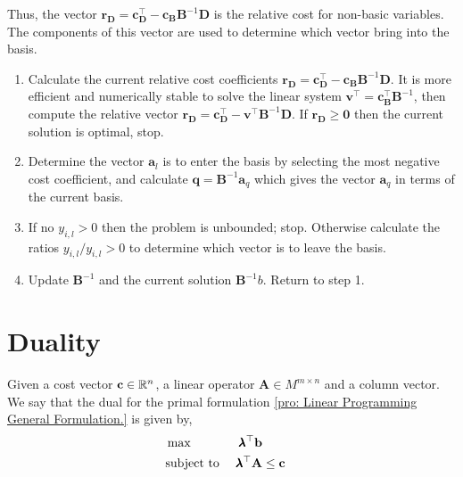 Thus, the vector $\mathbf{r}_{\mathbf{D}}=\mathbf{c}_{\mathbf{D}}^\top-\mathbf{c}_{\mathbf{B}}\mathbf{B}^{-1}\mathbf{D}$ is the relative cost for non-basic variables. The components of this vector are used to determine which vector bring into the basis.

\begin{enumerate}
	\item Calculate the current relative cost coefficients $\mathbf{r}_{\mathbf{D}}=\mathbf{c}_{\mathbf{D}}^\top-\mathbf{c}_{\mathbf{B}}\mathbf{B}^{-1}\mathbf{D}$. It is more efficient and numerically stable to solve the linear system $\mathbf{v}^\top = \mathbf{c}_{\mathbf{B}}^\top\mathbf{B}^{-1}$, then compute the relative vector
	$ \mathbf{r}_{\mathbf{D}}=\mathbf{c}_{\mathbf{D}}^\top-\mathbf{v}^\top\mathbf{B}^{-1}\mathbf{D}$. If $\mathbf{r}_{\mathbf{D}}\geq \mathbf{0}$ then the current solution is optimal, stop.
	\item Determine the vector $\mathbf{a}_l$ is to enter the basis by selecting the most negative cost coefficient, and calculate $\mathbf{q}=\mathbf{B}^{-1}\mathbf{a}_q$ which gives the vector $\mathbf{a}_q$ in terms of the current basis.
	\item If no $y_{i,l}>0$ then the problem is unbounded; stop. Otherwise calculate the ratios $y_{i,l}/y_{i,l}>0$ to determine which vector is to leave the basis.
	\item Update $\mathbf{B}^{-1}$ and the current solution $\mathbf{B}^{-1}b$. Return to step 1.
\end{enumerate}

\section{Duality}
\begin{problem}
	\label{pro: Linear Programming Dual Formulation.}
	Given a cost vector $\mathbf{c}\in \mathbb{R}^n$, a linear operator $\mathbf{A}\in M^{m\times n}$ and a column vector. We say that the dual for the primal formulation \ref{pro: Linear Programming General Formulation.} is given by,	
	\begin{align}
		&\max & \pmb{\lambda}^\top\mathbf{b} \label{eq: Dual Linear Programming Max}&\\
		&\text{subject to }& \pmb{\lambda}^\top\mathbf{A}&\leq \mathbf{c} & \label{eq: Dual Linear Programming Constraints} 
	\end{align}
\end{problem}

